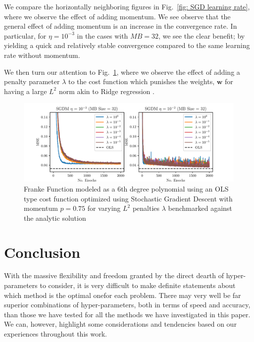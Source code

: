 \documentclass[reprint, english, nofootinbib]{revtex4-2}
\begin{document}
We compare the horizontally neighboring figures in Fig.~\ref{fig: SGD learning rate}, where we observe the effect of adding momentum. We see observe that the general effect of adding momentum is an increase in the convergence rate. In particular, for $\eta = 10^{-3}$ in the cases with $MB = 32$, we see the clear benefit; by yielding a quick and relatively stable convergence compared to the same learning rate without momentum.

We then turn our attention to Fig.~\ref{fig: SGD penalty}, where we observe the effect of adding a penalty parameter $\lambda$ to the cost function which punishes the weights, $\pmb w$ for having a large $L^2$ norm akin to Ridge regression \cite{4155_project_1}.
\begin{figure}
    \includegraphics[width=\columnwidth]{SGD_learning_penalty.pdf}
    \caption{\label{fig: SGD penalty}Franke Function modeled as a 6th degree polynomial using an OLS type cost function optimized using Stochastic Gradient Descent with momentum $p=0.75$ for varying $L^2$ penalties $\lambda$ benchmarked against the analytic solution}
\end{figure}


\section{Conclusion}


With the massive flexibility and freedom granted by the direct dearth of hyper-parameters to consider, it is very difficult to make definite statements about which method is the optimal onefor each problem. There may very well be far superior combinations of hyper-parameters, both in terms of speed and accuracy, than those we have tested for all the methods we have investigated in this paper. We can, however, highlight some considerations and tendencies based on our experiences throughout this work.

\end{document}
